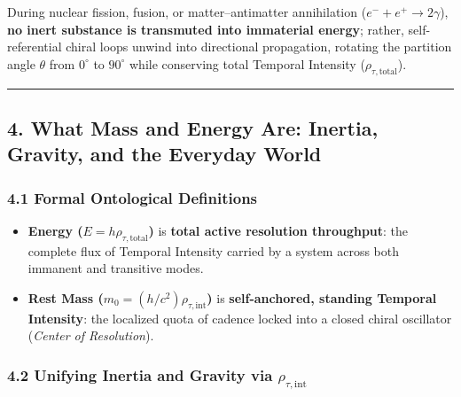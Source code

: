 \documentclass[
]{article}
\providecommand{\tightlist}{%
  \setlength{\itemsep}{0pt}\setlength{\parskip}{0pt}}
\begin{document}
During nuclear fission, fusion, or matter--antimatter annihilation
(\(e^- + e^+ \to 2\gamma\)), \textbf{no inert substance is transmuted
into immaterial energy}; rather, self-referential chiral loops unwind
into directional propagation, rotating the partition angle \(\theta\)
from \(0^\circ\) to \(90^\circ\) while conserving total Temporal
Intensity (\(\rho_{\tau,\text{total}}\)).

\begin{center}\rule{0.5\linewidth}{0.5pt}\end{center}

\subsection{4. What Mass and Energy Are: Inertia, Gravity, and the
Everyday
World}\label{what-mass-and-energy-are-inertia-gravity-and-the-everyday-world}

\subsubsection{4.1 Formal Ontological
Definitions}\label{formal-ontological-definitions}

\begin{itemize}
\tightlist
\item
  \textbf{Energy (\(E = h\rho_{\tau,\text{total}}\))} is \textbf{total
  active resolution throughput}: the complete flux of Temporal Intensity
  carried by a system across both immanent and transitive modes.
\item
  \textbf{Rest Mass (\(m_0 = (h/c^2)\rho_{\tau,\text{int}}\))} is
  \textbf{self-anchored, standing Temporal Intensity}: the localized
  quota of cadence locked into a closed chiral oscillator (\emph{Center
  of Resolution}).
\end{itemize}

\subsubsection{\texorpdfstring{4.2 Unifying Inertia and Gravity via
\(\rho_{\tau,\text{int}}\)}{4.2 Unifying Inertia and Gravity via \textbackslash rho\_\{\textbackslash tau,\textbackslash text\{int\}\}}}\label{unifying-inertia-and-gravity-via-rho_tautextint}
\end{document}
